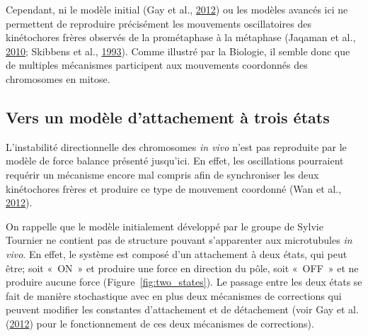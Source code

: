 \documentclass[12pt,a4paper,twoside,openright]{book}
\begin{document}
Cependant, ni le modèle initial (Gay et al.,
\protect\hyperlink{ref-Gay2012a}{2012}) ou les modèles avancés ici ne
permettent de reproduire précisément les mouvements oscillatoires des
kinétochores frères observés de la prométaphase à la métaphase (Jaqaman
et al., \protect\hyperlink{ref-Jaqaman2010}{2010}; Skibbens et al.,
\protect\hyperlink{ref-Skibbens1993}{1993}). Comme illustré par la
Biologie, il semble donc que de multiples mécanismes participent aux
mouvements coordonnés des chromosomes en mitose.

\subsection{Vers un modèle d'attachement à trois
états}\label{vers-un-moduxe8le-dattachement-uxe0-trois-uxe9tats}

\label{sec:three-state}

L'instabilité directionnelle des chromosomes \emph{in vivo} n'est pas
reproduite par le modèle de force balance présenté jusqu'ici. En effet,
les oscillations pourraient requérir un mécanisme encore mal compris
afin de synchroniser les deux kinétochores frères et produire ce type de
mouvement coordonné (Wan et al., \protect\hyperlink{ref-Wan2012}{2012}).

On rappelle que le modèle initialement développé par le groupe de Sylvie
Tournier ne contient pas de structure pouvant s'apparenter aux
microtubules \emph{in vivo}. En effet, le système est composé d'un
attachement à deux états, qui peut être; soit «~ON~» et produire une
force en direction du pôle, soit «~OFF~» et ne produire aucune force
(Figure~\ref{fig:two_states}). Le passage entre les deux états se fait
de manière stochastique avec en plus deux mécanismes de corrections qui
peuvent modifier les constantes d'attachement et de détachement (voir
Gay et al. (\protect\hyperlink{ref-Gay2012a}{2012}) pour le
fonctionnement de ces deux mécanismes de corrections).
\end{document}
